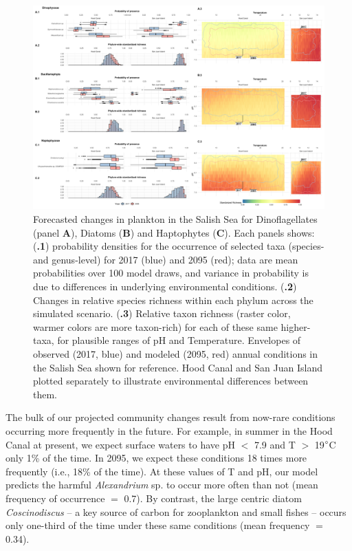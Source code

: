 \documentclass[11pt]{article}
\begin{document}
\begin{linenumbers}
 \begin{figure}
 \centering
 \includegraphics[width=1\linewidth]{Figures_for_MS/Top_fig3_2020-09-03.Other.sel.png}
\caption{\footnotesize{Forecasted changes in plankton in the Salish Sea {\color{red} for Dinoflagellates (panel \textbf{A}), Diatoms (\textbf{B}) and Haptophytes (\textbf{C}). Each panels shows:  (\textbf{.1}) probability densities for the occurrence of selected taxa (species- and genus-level) for 2017 (blue) and 2095 (red); data are mean probabilities over 100 model draws, and variance in probability is due to differences in underlying environmental conditions.  (\textbf{.2}) Changes in relative species richness within each phylum across the simulated scenario. (\textbf{.3}) Relative taxon richness (raster color, warmer colors are more taxon-rich) for each of these same higher-taxa, for plausible ranges of pH and Temperature. Envelopes of observed (2017, blue) and modeled (2095, red) annual conditions in the Salish Sea shown for reference. Hood Canal and San Juan Island plotted separately to illustrate environmental differences between them.}}}

\label{fig:Fig3}
 \end{figure}
 
The bulk of our projected community changes result from now-rare conditions occurring more frequently in the future. For example, in summer in the Hood Canal at present, we expect surface waters to have pH $<$ 7.9 and T $>$ 19$\degree$C only 1\% of the time. In 2095, we expect these conditions 18 times more frequently (i.e., 18\% of the time). At these values of T and pH, our model predicts the harmful \textit{Alexandrium} sp. to occur more often than not (mean frequency of occurrence $=$ 0.7). By contrast, the large centric diatom \textit{Coscinodiscus} -- a key source of carbon for zooplankton and small fishes -- occurs only one-third of the time under these same conditions (mean frequency $=$ 0.34). 


\end{linenumbers}
\end{document}
